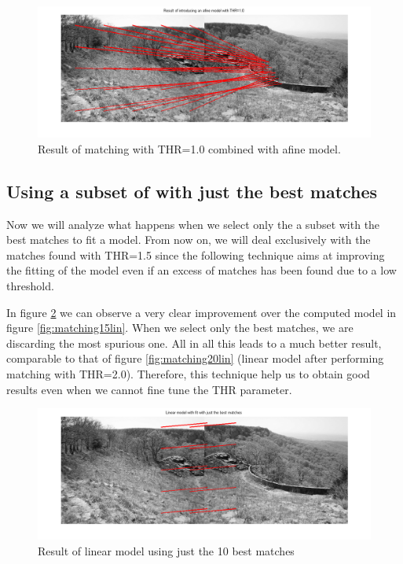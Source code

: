 \begin{figure}[htb]
	\centering
		\includegraphics[width=\textwidth]{./img/ex1/matching_10_afine.png}
	\caption{Result of matching with THR=1.0 combined with afine model.}
	\label{fig:matching10afi}
\end{figure}

\subsection{Using a subset of with just the best matches}

Now we will analyze what happens when we select only the a subset with the
best matches to fit a model. From now on, we will deal exclusively with
the matches found with THR=1.5 since the following technique aims at
improving the fitting of the model even if an excess of matches
has been found due to a low threshold.

In figure \ref{fig:linearbest10} we can observe a very clear improvement over
the computed model in figure \ref{fig:matching15lin}. When we select only
the best matches, we are discarding the most spurious one. All in all this
leads to a much better result, comparable to that of figure
\ref{fig:matching20lin} (linear model after performing matching with THR=2.0).
Therefore, this technique help us to obtain good results even when we cannot
fine tune the THR parameter.

\begin{figure}[htb]
	\centering
		\includegraphics[width=\textwidth]{./img/ex1/linear_best_matches.png}
	\caption{Result of linear model using just the 10 best matches}
	\label{fig:linearbest10}
\end{figure}

